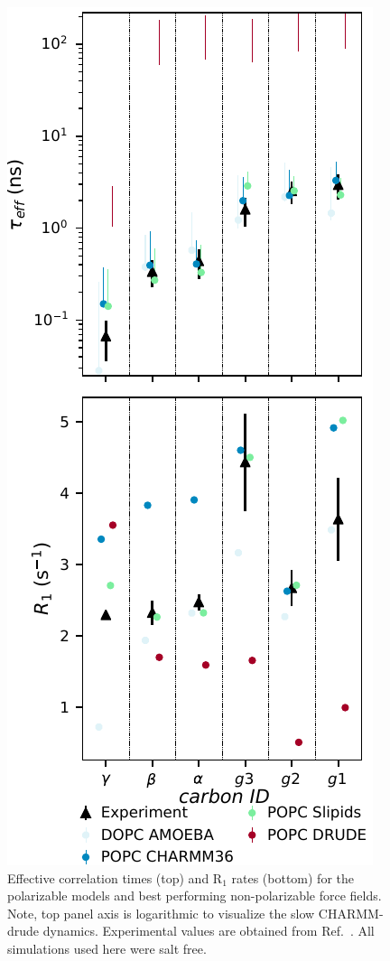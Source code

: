 \documentclass[journal=jacsat,manuscript=article,layout=singlecolumn]{achemso}
\begin{document}
\begin{figure}[!hbt]
	\centering
	\includegraphics{Figures/both_log.pdf}
	\caption{Effective correlation times (top) and R$_1$ rates (bottom) for the polarizable models and best performing non-polarizable force fields. Note, top panel axis is logarithmic to visualize the slow CHARMM-drude dynamics. Experimental values are obtained from Ref.~. All simulations used here were salt free.}
	\label{fig:correlation_times}


\end{figure}
\end{document}
